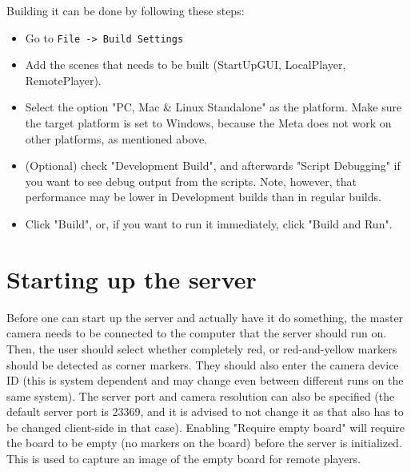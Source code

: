 \documentclass{report}
\begin{document}
	Building it can be done by following these steps:
	
	\begin{itemize}
		\item Go to \verb#File -> Build Settings#
		\item Add the scenes that needs to be built (StartUpGUI, LocalPlayer, RemotePlayer).
		\item Select the option "PC, Mac \& Linux Standalone" as the platform. Make sure the 
		      target platform is set to Windows, because the Meta does not work on other platforms,
		      as mentioned above.
		\item (Optional) check "Development Build", and afterwards "Script Debugging" if you
			  want to see debug output from the scripts. Note, however, that performance
			  may be lower in Development builds than in regular builds. 
		\item Click "Build", or, if you want to run it immediately, click "Build and Run".
	\end{itemize}

\section*{Starting up the server}
	Before one can start up the server and actually have it do something, the master
	camera needs to be connected to the computer that the server should run on. 
	Then, the user should select whether completely red, or red-and-yellow
	markers should be detected as corner markers. They should also enter the camera
	device ID (this is system dependent and may change even between different runs on the 
	same system). The server port and camera resolution can also be specified (the default 
	server port is 23369, and it is advised to not change it as that also has to be changed
	client-side in that case). Enabling "Require empty board" will require the board
	to be empty (no markers on the board) before the server is initialized. This is
	used to capture an image of the empty board for remote players.
	
\end{document}
